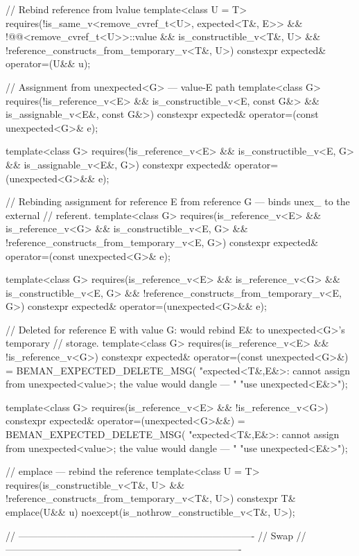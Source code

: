 \begin{codeblock}
{{    // Rebind reference from lvalue
    template<class U = T>
      requires(!is_same_v<remove_cvref_t<U>, expected<T&, E>> &&
               !@@<remove_cvref_t<U>>::value &&
               is_constructible_v<T&, U> && !reference_constructs_from_temporary_v<T&, U>)
    constexpr expected& operator=(U&& u);

    // Assignment from unexpected<G> — value-E path
    template<class G>
      requires(!is_reference_v<E> && is_constructible_v<E, const G&> &&
               is_assignable_v<E&, const G&>)
    constexpr expected& operator=(const unexpected<G>& e);

    template<class G>
      requires(!is_reference_v<E> && is_constructible_v<E, G> && is_assignable_v<E&, G>)
    constexpr expected& operator=(unexpected<G>&& e);

    // Rebinding assignment for reference E from reference G — binds unex_ to the external
    // referent.
    template<class G>
      requires(is_reference_v<E> && is_reference_v<G> && is_constructible_v<E, G> &&
               !reference_constructs_from_temporary_v<E, G>)
    constexpr expected& operator=(const unexpected<G>& e);

    template<class G>
      requires(is_reference_v<E> && is_reference_v<G> && is_constructible_v<E, G> &&
               !reference_constructs_from_temporary_v<E, G>)
    constexpr expected& operator=(unexpected<G>&& e);

    // Deleted for reference E with value G: would rebind E& to unexpected<G>'s temporary
    // storage.
    template<class G>
      requires(is_reference_v<E> && !is_reference_v<G>)
    constexpr expected& operator=(const unexpected<G>&) = BEMAN_EXPECTED_DELETE_MSG(
        "expected<T&,E&>: cannot assign from unexpected<value>; the value would dangle — "
        "use unexpected<E&>");

    template<class G>
      requires(is_reference_v<E> && !is_reference_v<G>)
    constexpr expected& operator=(unexpected<G>&&) = BEMAN_EXPECTED_DELETE_MSG(
        "expected<T&,E&>: cannot assign from unexpected<value>; the value would dangle — "
        "use unexpected<E&>");

    // emplace — rebind the reference
    template<class U = T>
      requires(is_constructible_v<T&, U> && !reference_constructs_from_temporary_v<T&, U>)
    constexpr T& emplace(U&& u) noexcept(is_nothrow_constructible_v<T&, U>);

    // -------------------------------------------------------------------------
    // Swap
    // -------------------------------------------------------------------------

}}
\end{codeblock}
